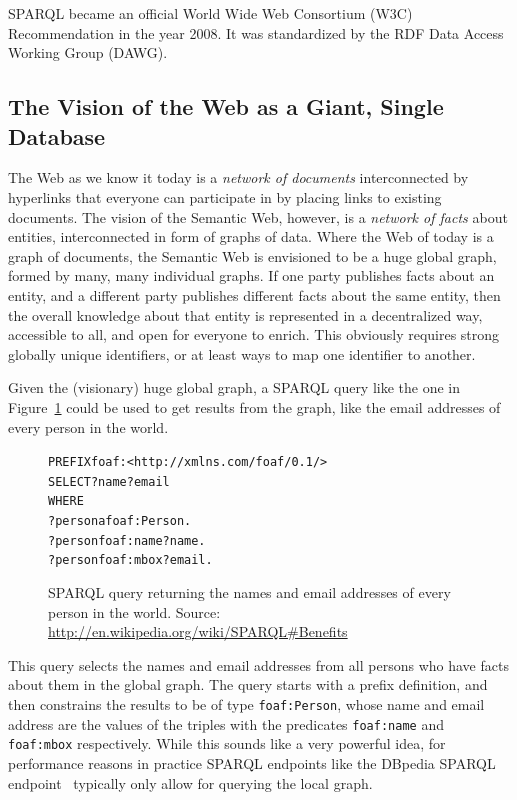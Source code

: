\documentclass[12pt]{article}
\newenvironment{code}[1]
{\begin{lrbox}{\inverbatim}\begin{minipage}{13.5cm}\begin{alltt}{#1}}
{\end{alltt}\end{minipage}\end{lrbox}\colorbox{lightgray}{\usebox{\inverbatim}}}
\begin{document}
SPARQL became an official World Wide Web Consortium (W3C) Recommendation in the year 2008. It was standardized by the RDF Data Access Working Group (DAWG).

\subsection{The Vision of the Web as a Giant, Single Database}
The Web as we know it today is a \emph{network of documents} interconnected by hyperlinks that everyone can participate in by placing links to existing documents. The vision of the Semantic Web, however, is a \emph{network of facts} about entities, interconnected in form of graphs of data. Where the Web of today is a graph of documents, the Semantic Web is envisioned to be a huge global graph, formed by many, many individual graphs. If one party publishes facts about an entity, and a different party publishes different facts about the same entity, then the overall knowledge about that entity is represented in a decentralized way, accessible to all, and open for everyone to enrich. This obviously requires strong globally unique identifiers, or at least ways to map one identifier to another.

Given the (visionary) huge global graph, a SPARQL query like the one in Figure~\ref{code:sparql} could be used to get results from the graph, like the email addresses of every person in the world.

\begin{figure}[htbp!]
\begin{center}
{\footnotesize
\begin{code}
PREFIX foaf: <http://xmlns.com/foaf/0.1/>
SELECT ?name ?email
WHERE {
  ?person a foaf:Person.
  ?person foaf:name ?name.
  ?person foaf:mbox ?email.
}
\end{code}}
  \caption[SPARQL query returning the names and email addresses of every person in the world.]{SPARQL query returning the names and email addresses of every person in the world. Source: \url{http://en.wikipedia.org/wiki/SPARQL\#Benefits}} 
  \label{code:sparql}
  \end{center}  
\end{figure}

This query selects the names and email addresses from all persons who have facts about them in the global graph. The query starts with a prefix definition, and then constrains the results to be of type \texttt{foaf:Person}, whose name and email address are the values of the triples with the predicates \texttt{foaf:name} and \texttt{foaf:mbox} respectively. While this sounds like a very powerful idea, for performance reasons in practice SPARQL endpoints like the DBpedia SPARQL endpoint~\cite{dbpedia:sparql} typically only allow for querying the local graph.
\end{document}

